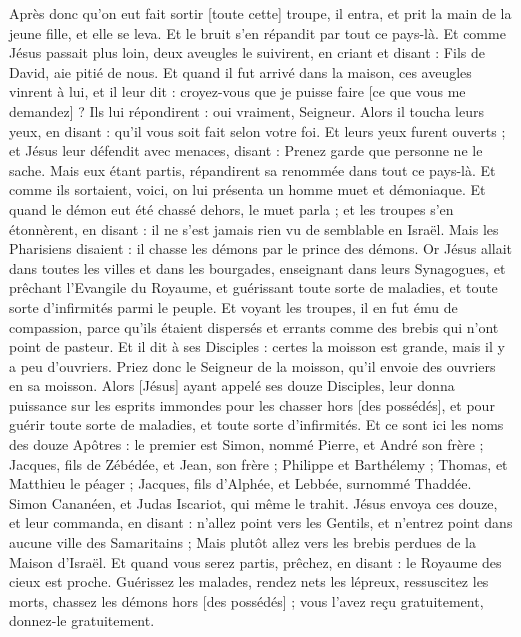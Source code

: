 \begin{multicols}{2}
Après donc qu'on eut fait sortir [toute cette] troupe, il entra, et prit la main de la jeune fille, et elle se leva.
Et le bruit s'en répandit par tout ce pays-là.
Et comme Jésus passait plus loin, deux aveugles le suivirent, en criant et disant : Fils de David, aie pitié de nous.
Et quand il fut arrivé dans la maison, ces aveugles vinrent à lui, et il leur dit : croyez-vous que je puisse faire [ce que vous me demandez] ? Ils lui répondirent : oui vraiment, Seigneur.
Alors il toucha leurs yeux, en disant : qu'il vous soit fait selon votre foi.
Et leurs yeux furent ouverts ; et Jésus leur défendit avec menaces, disant : Prenez garde que personne ne le sache.
Mais eux étant partis, répandirent sa renommée dans tout ce pays-là.
Et comme ils sortaient, voici, on lui présenta un homme muet et démoniaque.
Et quand le démon eut été chassé dehors, le muet parla ; et les troupes s'en étonnèrent, en disant : il ne s'est jamais rien vu de semblable en Israël.
Mais les Pharisiens disaient : il chasse les démons par le prince des démons.
Or Jésus allait dans toutes les villes et dans les bourgades, enseignant dans leurs Synagogues, et prêchant l'Evangile du Royaume, et guérissant toute sorte de maladies, et toute sorte d'infirmités parmi le peuple.
Et voyant les troupes, il en fut ému de compassion, parce qu'ils étaient dispersés et errants comme des brebis qui n'ont point de pasteur.
Et il dit à ses Disciples : certes la moisson est grande, mais il y a peu d'ouvriers.
Priez donc le Seigneur de la moisson, qu'il envoie des ouvriers en sa moisson.
\VerseOne{}Alors [Jésus] ayant appelé ses douze Disciples, leur donna puissance sur les esprits immondes pour les chasser hors [des possédés], et pour guérir toute sorte de maladies, et toute sorte d'infirmités.
Et ce sont ici les noms des douze Apôtres : le premier est Simon, nommé Pierre, et André son frère ; Jacques, fils de Zébédée, et Jean, son frère ;
Philippe et Barthélemy ; Thomas, et Matthieu le péager ; Jacques, fils d'Alphée, et Lebbée, surnommé Thaddée.
Simon Cananéen, et Judas Iscariot, qui même le trahit.
Jésus envoya ces douze, et leur commanda, en disant : n'allez point vers les Gentils, et n'entrez point dans aucune ville des Samaritains ;
Mais plutôt allez vers les brebis perdues de la Maison d'Israël.
Et quand vous serez partis, prêchez, en disant : le Royaume des cieux est proche.
Guérissez les malades, rendez nets les lépreux, ressuscitez les morts, chassez les démons hors [des possédés] ; vous l'avez reçu gratuitement, donnez-le gratuitement.

\end{multicols}
